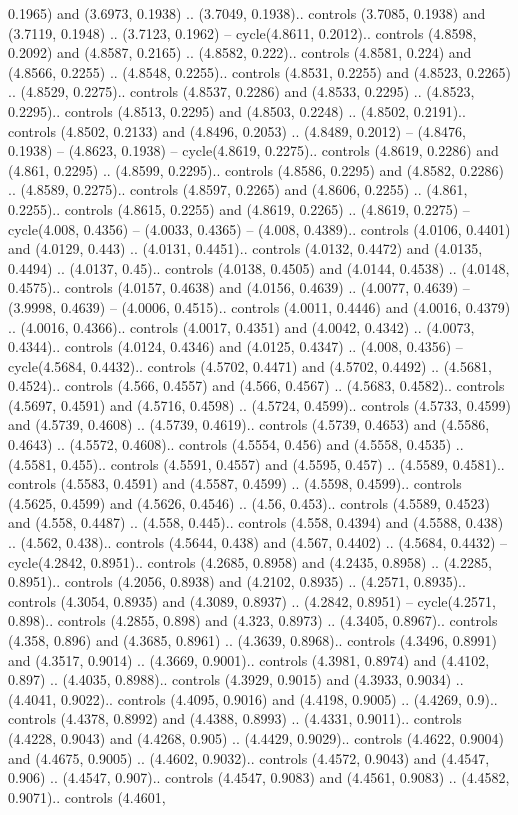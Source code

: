 0.1965) and (3.6973, 0.1938) .. (3.7049, 0.1938).. controls (3.7085, 0.1938) and (3.7119, 0.1948) .. (3.7123, 0.1962) -- cycle(4.8611, 0.2012).. controls (4.8598, 0.2092) and (4.8587, 0.2165) .. (4.8582, 0.222).. controls (4.8581, 0.224) and (4.8566, 0.2255) .. (4.8548, 0.2255).. controls (4.8531, 0.2255) and (4.8523, 0.2265) .. (4.8529, 0.2275).. controls (4.8537, 0.2286) and (4.8533, 0.2295) .. (4.8523, 0.2295).. controls (4.8513, 0.2295) and (4.8503, 0.2248) .. (4.8502, 0.2191).. controls (4.8502, 0.2133) and (4.8496, 0.2053) .. (4.8489, 0.2012) -- (4.8476, 0.1938) -- (4.8623, 0.1938) -- cycle(4.8619, 0.2275).. controls (4.8619, 0.2286) and (4.861, 0.2295) .. (4.8599, 0.2295).. controls (4.8586, 0.2295) and (4.8582, 0.2286) .. (4.8589, 0.2275).. controls (4.8597, 0.2265) and (4.8606, 0.2255) .. (4.861, 0.2255).. controls (4.8615, 0.2255) and (4.8619, 0.2265) .. (4.8619, 0.2275) -- cycle(4.008, 0.4356) -- (4.0033, 0.4365) -- (4.008, 0.4389).. controls (4.0106, 0.4401) and (4.0129, 0.443) .. (4.0131, 0.4451).. controls (4.0132, 0.4472) and (4.0135, 0.4494) .. (4.0137, 0.45).. controls (4.0138, 0.4505) and (4.0144, 0.4538) .. (4.0148, 0.4575).. controls (4.0157, 0.4638) and (4.0156, 0.4639) .. (4.0077, 0.4639) -- (3.9998, 0.4639) -- (4.0006, 0.4515).. controls (4.0011, 0.4446) and (4.0016, 0.4379) .. (4.0016, 0.4366).. controls (4.0017, 0.4351) and (4.0042, 0.4342) .. (4.0073, 0.4344).. controls (4.0124, 0.4346) and (4.0125, 0.4347) .. (4.008, 0.4356) -- cycle(4.5684, 0.4432).. controls (4.5702, 0.4471) and (4.5702, 0.4492) .. (4.5681, 0.4524).. controls (4.566, 0.4557) and (4.566, 0.4567) .. (4.5683, 0.4582).. controls (4.5697, 0.4591) and (4.5716, 0.4598) .. (4.5724, 0.4599).. controls (4.5733, 0.4599) and (4.5739, 0.4608) .. (4.5739, 0.4619).. controls (4.5739, 0.4653) and (4.5586, 0.4643) .. (4.5572, 0.4608).. controls (4.5554, 0.456) and (4.5558, 0.4535) .. (4.5581, 0.455).. controls (4.5591, 0.4557) and (4.5595, 0.457) .. (4.5589, 0.4581).. controls (4.5583, 0.4591) and (4.5587, 0.4599) .. (4.5598, 0.4599).. controls (4.5625, 0.4599) and (4.5626, 0.4546) .. (4.56, 0.453).. controls (4.5589, 0.4523) and (4.558, 0.4487) .. (4.558, 0.445).. controls (4.558, 0.4394) and (4.5588, 0.438) .. (4.562, 0.438).. controls (4.5644, 0.438) and (4.567, 0.4402) .. (4.5684, 0.4432) -- cycle(4.2842, 0.8951).. controls (4.2685, 0.8958) and (4.2435, 0.8958) .. (4.2285, 0.8951).. controls (4.2056, 0.8938) and (4.2102, 0.8935) .. (4.2571, 0.8935).. controls (4.3054, 0.8935) and (4.3089, 0.8937) .. (4.2842, 0.8951) -- cycle(4.2571, 0.898).. controls (4.2855, 0.898) and (4.323, 0.8973) .. (4.3405, 0.8967).. controls (4.358, 0.896) and (4.3685, 0.8961) .. (4.3639, 0.8968).. controls (4.3496, 0.8991) and (4.3517, 0.9014) .. (4.3669, 0.9001).. controls (4.3981, 0.8974) and (4.4102, 0.897) .. (4.4035, 0.8988).. controls (4.3929, 0.9015) and (4.3933, 0.9034) .. (4.4041, 0.9022).. controls (4.4095, 0.9016) and (4.4198, 0.9005) .. (4.4269, 0.9).. controls (4.4378, 0.8992) and (4.4388, 0.8993) .. (4.4331, 0.9011).. controls (4.4228, 0.9043) and (4.4268, 0.905) .. (4.4429, 0.9029).. controls (4.4622, 0.9004) and (4.4675, 0.9005) .. (4.4602, 0.9032).. controls (4.4572, 0.9043) and (4.4547, 0.906) .. (4.4547, 0.907).. controls (4.4547, 0.9083) and (4.4561, 0.9083) .. (4.4582, 0.9071).. controls (4.4601, 